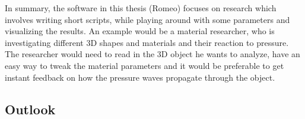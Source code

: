In summary, the software in this thesis (Romeo) focuses on research which involves writing short scripts, while playing around with some parameters and visualizing the results. 
An example would be a material researcher, who is investigating different 3D shapes and materials and their reaction to pressure.
The researcher would need to read in the 3D object he wants to analyze, have an easy way to tweak the material parameters and it would be preferable to get instant feedback on how the pressure waves propagate through the object.


\subsection{Outlook}
